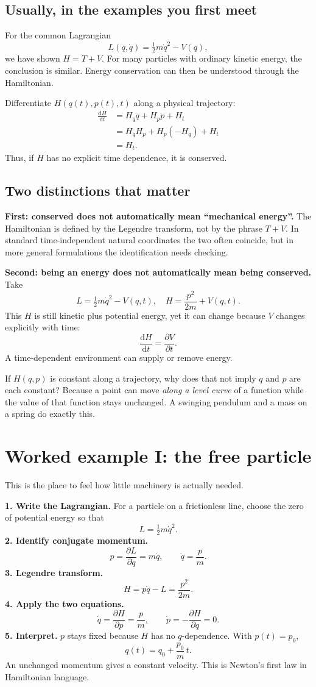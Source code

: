 \documentclass[11pt,a4paper,oneside]{article}
\newcommand{\pd}[2]{\frac{\partial #1}{\partial #2}}
\newcommand{\dt}[1]{\frac{\mathrm d #1}{\mathrm d t}}
\newcommand{\eqstep}[1]{\vspace{2pt}\textbf{#1}\hspace{0.4em}}
\begin{document}
\subsection{Usually, in the examples you first meet}
For the common Lagrangian
\[
 L(q,\dot q)=\tfrac12m\dot q^2-V(q),
\]
we have shown $H=T+V$. For many particles with ordinary kinetic energy, the conclusion is similar. Energy conservation can then be understood through the Hamiltonian.

Differentiate $H(q(t),p(t),t)$ along a physical trajectory:
\begin{align*}
 \dt{H}
 &=H_q\dot q+H_p\dot p+H_t\\
 &=H_q H_p+H_p(-H_q)+H_t\\
 &=\boxed{H_t}.
\end{align*}
Thus, if $H$ has no explicit time dependence, it is conserved.

\subsection{Two distinctions that matter}
\textbf{First: conserved does not automatically mean ``mechanical energy''.} The Hamiltonian is defined by the Legendre transform, not by the phrase $T+V$. In standard time-independent natural coordinates the two often coincide, but in more general formulations the identification needs checking.

\textbf{Second: being an energy does not automatically mean being conserved.} Take
\[
 L=\tfrac12m\dot q^2-V(q,t),\quad
 H=\frac{p^2}{2m}+V(q,t).
\]
This $H$ is still kinetic plus potential energy, yet it can change because $V$ changes explicitly with time:
\[
 \dt H=\pd{V}{t}.
\]
A time-dependent environment can supply or remove energy.

\begin{pausebox}
If $H(q,p)$ is constant along a trajectory, why does that not imply $q$ and $p$ are each constant? Because a point can move \emph{along a level curve} of a function while the value of that function stays unchanged. A swinging pendulum and a mass on a spring do exactly this.
\end{pausebox}

\section{Worked example I: the free particle}
This is the place to feel how little machinery is actually needed.

\eqstep{1. Write the Lagrangian.} For a particle on a frictionless line, choose the zero of potential energy so that
\[
 L=\tfrac12m\dot q^2.
\]
\eqstep{2. Identify conjugate momentum.}
\[
 p=\pd{L}{\dot q}=m\dot q,\qquad\dot q=\frac{p}{m}.
\]
\eqstep{3. Legendre transform.}
\[
 H=p\dot q-L=\frac{p^2}{2m}.
\]
\eqstep{4. Apply the two equations.}
\[
 \dot q=\pd{H}{p}=\frac{p}{m},\qquad
 \dot p=-\pd{H}{q}=0.
\]
\eqstep{5. Interpret.} $p$ stays fixed because $H$ has no $q$-dependence. With $p(t)=p_0$,
\[
 \boxed{q(t)=q_0+\frac{p_0}{m}\,t.}
\]
An unchanged momentum gives a constant velocity. This is Newton's first law in Hamiltonian language.
\end{document}
